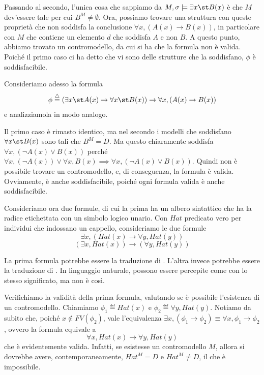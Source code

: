 Passando al secondo, l'unica cosa che sappiamo da \(M,\sigma\models \exists x\st B(x)\) è che \(M\) dev'essere tale per cui \(B^M \neq \emptyset\). Ora, possiamo trovare una struttura con queste proprietà che non soddisfa la conclusione \(\forall x, (A(x)\to B(x))\), in particolare con \(M\) che contiene un elemento \(d\) che soddisfa \(A\) e non \(B\). A questo punto, abbiamo trovato un contromodello, da cui si ha che la formula non è valida. Poiché il primo caso ci ha detto che vi sono delle strutture che la soddisfano, \(\phi\) è soddisfacibile.

Consideriamo adesso la formula 
\[\phi \eqdef (\exists x\st A(x)\to \forall x\st B(x))\to \forall x, (A(x)\to B(x))\]
e analizziamola in modo analogo.

Il primo caso è rimasto identico, ma nel secondo i modelli che soddisfano \(\forall x\st B(x)\) sono tali che \(B^M = D\). Ma questo chiaramente soddisfa \(\forall x, (\neg A(x)\lor B(x))\) perché \(\forall x, (\neg A(x)) \lor \forall x, B(x) \implies \forall x, (\neg A(x)\lor B(x))\). Quindi non è possibile trovare un contromodello, e, di conseguenza, la formula è valida. Ovviamente, è anche soddisfacibile, poiché ogni formula valida è anche soddisfacibile.

Consideriamo ora due formule, di cui la prima ha un albero sintattico che ha la radice etichettata con un simbolo logico unario.
Con \(Hat\) predicato vero per individui che indossano un cappello, consideriamo le due formule
\[\exists x, (Hat(x) \to \forall y, Hat(y))\]
\[(\exists x, Hat(x))\to(\forall y, Hat(y))\]

La prima formula potrebbe essere la traduzione di . L'altra invece potrebbe essere la traduzione di . In linguaggio naturale, possono essere percepite come con lo stesso significato, ma non è così. 

Verifichiamo la validità della prima formula, valutando se è possibile l'esistenza di un contromodello. Chiamiamo \(\phi_1 \eqdef Hat(x)\) e \(\phi_2 \eqdef \forall y, Hat(y)\). Notiamo da subito che, poiché \(x \notin FV(\phi_2)\), vale l'equivalenza \(\exists x, (\phi_1 \to \phi_2) \equiv \forall x, \phi_1 \to \phi_2\), ovvero la formula equivale a
\[\forall x, Hat(x) \to \forall y, Hat(y)\]
che è evidentemente valida. Infatti, se esistesse un contromodello \(M\), allora si dovrebbe avere, contemporaneamente, \(Hat^M = D\) e \(Hat^M \neq D\), il che è impossibile.

